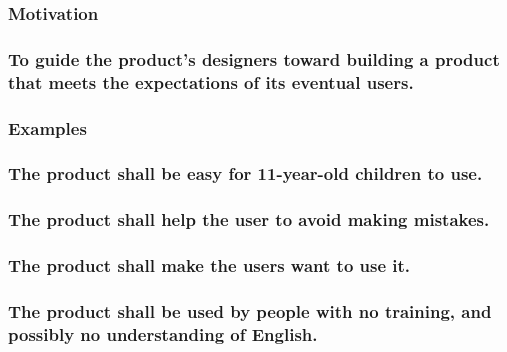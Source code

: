 \documentclass[
]{article}
\begin{document}
\hypertarget{motivation-31}{%
\subsubsection{Motivation}\label{motivation-31}}

\hypertarget{to-guide-the-products-designers-toward-building-a-product-that-meets-the-expectations-of-its-eventual-users.}{%
\subsubsection{To guide the product's designers toward building a
product that meets the expectations of its eventual
users.}\label{to-guide-the-products-designers-toward-building-a-product-that-meets-the-expectations-of-its-eventual-users.}}

\hypertarget{examples-16}{%
\subsubsection{Examples}\label{examples-16}}

\hypertarget{the-product-shall-be-easy-for-11-year-old-children-to-use.}{%
\subsubsection{The product shall be easy for 11-year-old children to
use.}\label{the-product-shall-be-easy-for-11-year-old-children-to-use.}}

\hypertarget{the-product-shall-help-the-user-to-avoid-making-mistakes.}{%
\subsubsection{The product shall help the user to avoid making
mistakes.}\label{the-product-shall-help-the-user-to-avoid-making-mistakes.}}

\hypertarget{the-product-shall-make-the-users-want-to-use-it.}{%
\subsubsection{The product shall make the users want to use
it.}\label{the-product-shall-make-the-users-want-to-use-it.}}

\hypertarget{the-product-shall-be-used-by-people-with-no-training-and-possibly-no-understanding-of-english.}{%
\subsubsection{The product shall be used by people with no training, and
possibly no understanding of
English.}\label{the-product-shall-be-used-by-people-with-no-training-and-possibly-no-understanding-of-english.}}
\end{document}
